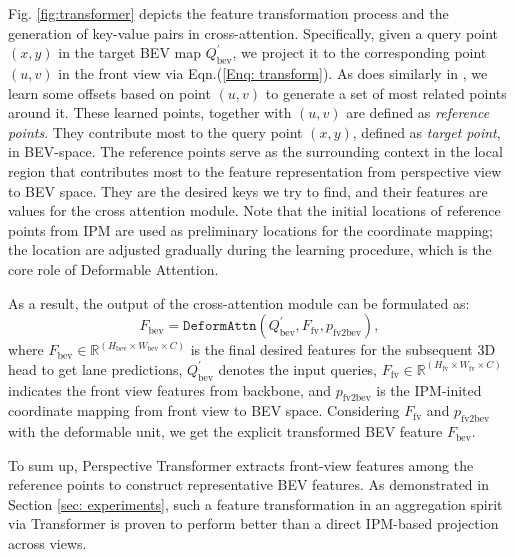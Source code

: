 \documentclass[runningheads]{llncs}
\begin{document}
Fig. \ref{fig:transformer} depicts the feature transformation process and the generation of key-value pairs in cross-attention.
Specifically, given a query point $(x,y)$ in the target BEV map $Q^{'}_{\text{bev}}$, we project it to the corresponding point $(u,v)$ in the  front view via Eqn.(\ref{Enq: transform}). As does similarly in \cite{zhu2021deformable}, we learn some offsets based on point $(u,v)$ 
to generate a set of most related points around it. 
{These learned points, together with $(u,v)$ are defined as \textit{reference points}.}
They contribute most to the query point $(x,y)$,  defined as \textit{target point}, in BEV-space.
{The reference points} serve as {the surrounding context in the local region} that contributes most to the feature representation from perspective view to BEV space.
They are the desired keys we try to find, and their features are values for the cross attention module.
Note that the initial locations of reference points from IPM are used as preliminary locations for the coordinate mapping; 
the location 
are adjusted gradually during the learning procedure, which is the core role of Deformable Attention.




As a result, the output of the cross-attention module can be formulated as:
\begin{equation}
    F_{\text{bev}} = \texttt{DeformAttn}(Q^{'}_{\text{bev}}, F_{\text{fv}}, p_{\text{fv2bev}}),
\end{equation}
where $F_{\text{bev}} \in \mathbb{R}^{(H_{\text{bev}} \times W_{\text{bev}} \times C)}$ is the final desired features for the subsequent 3D head to get lane predictions, 
$Q^{'}_{\text{bev}}$ denotes the input queries, 
$F_{\text{fv}} \in \mathbb{R}^{(H_{\text{fv}} \times W_{\text{fv}} \times C)}$ indicates the front view features from backbone, 
and $p_{\text{fv2bev}}$ is 
the IPM-inited coordinate mapping from front view to BEV space. 
Considering $F_{\text{fv}}$ and $p_{\text{fv2bev}}$ with the deformable unit, we get the explicit transformed BEV feature $F_{\text{bev}}$.







To sum up, Perspective Transformer extracts front-view features among the reference points to construct representative BEV features.
As demonstrated in Section \ref{sec: experiments}, such a feature transformation in an aggregation spirit via Transformer
is proven to perform better than a direct IPM-based projection across views. 
\end{document}
